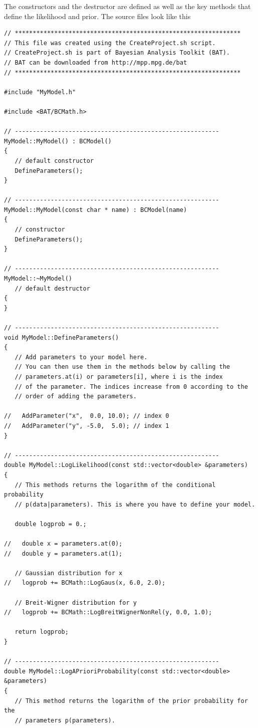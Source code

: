 \documentclass[11pt, a4paper]{article}
\begin{document}
The constructors and the destructor are defined as well as the key
methods that define the likelihood and prior. The source files look
like this
%
\begin{verbatim}
// ***************************************************************
// This file was created using the CreateProject.sh script.
// CreateProject.sh is part of Bayesian Analysis Toolkit (BAT).
// BAT can be downloaded from http://mpp.mpg.de/bat
// ***************************************************************

#include "MyModel.h"

#include <BAT/BCMath.h>

// ---------------------------------------------------------
MyModel::MyModel() : BCModel()
{
   // default constructor
   DefineParameters();
}

// ---------------------------------------------------------
MyModel::MyModel(const char * name) : BCModel(name)
{
   // constructor
   DefineParameters();
}

// ---------------------------------------------------------
MyModel::~MyModel()
   // default destructor
{
}

// ---------------------------------------------------------
void MyModel::DefineParameters()
{
   // Add parameters to your model here.
   // You can then use them in the methods below by calling the
   // parameters.at(i) or parameters[i], where i is the index
   // of the parameter. The indices increase from 0 according to the
   // order of adding the parameters.

//   AddParameter("x",  0.0, 10.0); // index 0
//   AddParameter("y", -5.0,  5.0); // index 1
}

// ---------------------------------------------------------
double MyModel::LogLikelihood(const std::vector<double> &parameters)
{
   // This methods returns the logarithm of the conditional probability
   // p(data|parameters). This is where you have to define your model.

   double logprob = 0.;

//   double x = parameters.at(0);
//   double y = parameters.at(1);

   // Gaussian distribution for x
//   logprob += BCMath::LogGaus(x, 6.0, 2.0);

   // Breit-Wigner distribution for y
//   logprob += BCMath::LogBreitWignerNonRel(y, 0.0, 1.0);

   return logprob;
}

// ---------------------------------------------------------
double MyModel::LogAPrioriProbability(const std::vector<double> &parameters)
{
   // This method returns the logarithm of the prior probability for the
   // parameters p(parameters).


\end{verbatim}
\end{document}
